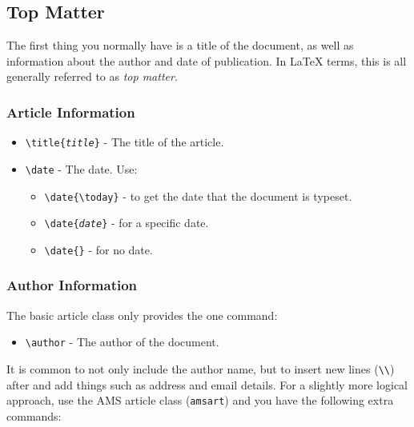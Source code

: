\documentclass{article}
\begin{document}
\subsection{Top Matter}
The first thing you normally have is a title of the document, as well as
information about the author and date of publication.  In \LaTeX{} terms,
this is all generally referred to as \emph{top matter}.
 
\subsubsection{Article Information}
\begin{itemize}
    \item \texttt{\textbackslash title\{\emph{title}\}} - The title of the article.
    \item \texttt{\textbackslash date} - The date. Use:
        \begin{itemize}
            \item \texttt{\textbackslash date\{\textbackslash today\}} - to get the
            date that the document is typeset.
            \item \texttt{\textbackslash date\{\emph{date}\}} - for a  %
            specific date.
            \item \texttt{\textbackslash date\{\}} - for no date.
        \end{itemize}
\end{itemize}
 
\subsubsection{Author Information}
The basic article class only provides the one command:
\begin{itemize}
    \item \texttt{\textbackslash author} - The author of the document.
\end{itemize}
 
It is common to not only include the author name, but to insert new
lines (\texttt{\textbackslash\textbackslash}) after and add things such
as address and email details.  For a slightly more logical approach, use
the AMS article class (\texttt{amsart}) and you have the following extra
commands:
 
\end{document}
